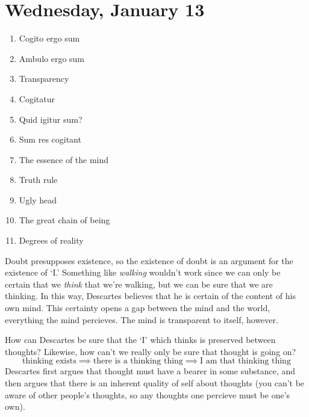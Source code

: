 
\section{Wednesday, January 13}

\begin{multicols}{2}
\begin{enumerate}
\item Cogito ergo sum
\item Ambulo ergo sum
\item Transparency
\item Cogitatur
\item Quid igitur sum?
\item Sum res cogitant
\item The essence of the mind
\item Truth rule
\item Ugly head
\item The great chain of being
\item Degrees of reality
\end{enumerate}
\end{multicols}

Doubt presupposes existence, so the existence of doubt is an argument for the existence of `I.' Something like \emph{walking} wouldn't work since we can only be certain that we \emph{think} that we're walking, but we can be sure that we are thinking. In this way, Descartes believes that he is certain of the content of his own mind. This certainty opens a gap between the mind and the world, everything the mind percieves. The mind is transparent to itself, however.

\begin{problem}
How can Descartes be sure that the `I' which thinks is preserved between thoughts? Likewise, how can't we really only be sure that thought is going on?
\[ \text{thinking exists} \implies \text{there is a thinking thing} \implies \text{I am that thinking thing} \]
Descartes first argues that thought must have a bearer in some substance, and then argues that there is an inherent quality of self about thoughts (you can't be aware of other people's thoughts, so any thoughts one percieve must be one's own). 
\end{problem}


